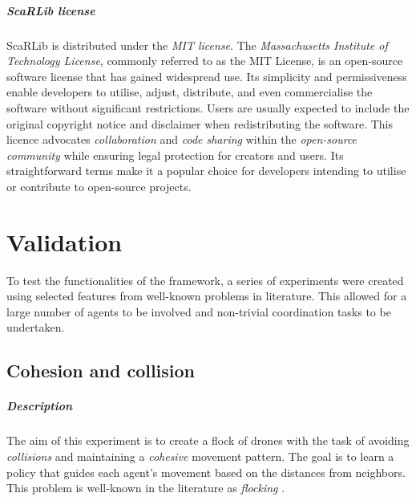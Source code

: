 \documentclass[12pt,a4paper,openright,twoside]{book}
\begin{document}
\paragraph{ScaRLib license} 
ScaRLib is distributed under the \emph{MIT license}. 
The \emph{Massachusetts Institute of Technology License}, commonly referred to as the MIT License, is an open-source software license 
    that has gained widespread use. Its simplicity and permissiveness enable developers to utilise, adjust, distribute, and even 
    commercialise the software without significant restrictions. Users are usually expected to include the original copyright notice 
    and disclaimer when redistributing the software. This licence advocates \emph{collaboration} and \emph{code sharing} 
    within the \emph{open-source community} while ensuring legal protection for creators and users. Its straightforward terms make it a 
    popular choice for developers intending to utilise or contribute to open-source projects.

\chapter{Validation} 
\label{chap:validation}
To test the functionalities of the framework, a series of experiments were created using selected 
    features from well-known problems in literature. This allowed for a large number of 
    agents to be involved and non-trivial coordination tasks to be undertaken.

\section{Cohesion and collision}

\paragraph{Description}
The aim of this experiment is to create a flock of drones with the task of avoiding \emph{collisions}
    and maintaining a \emph{cohesive} movement pattern. The goal is to learn a policy that guides each
    agent's movement based on the distances from neighbors.
    This problem is well-known in the literature as \emph{flocking} \cite{DBLP:conf/siggraph/Reynolds87,inverserl}.
\end{document}
